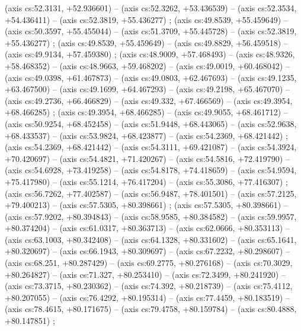     (axis cs:52.3131,    +52.936601) --  (axis cs:52.3262,    +53.436539) --  (axis cs:52.3534,    +54.436411) --  (axis cs:52.3819,    +55.436277) ;
    (axis cs:49.8539,    +55.459649) --  (axis cs:50.3597,    +55.455044) --  (axis cs:51.3709,    +55.445728) --  (axis cs:52.3819,    +55.436277) ;
    (axis cs:49.8539,    +55.459649) --  (axis cs:49.8829,    +56.459518) --  (axis cs:49.9134,    +57.459380) ;
    (axis cs:48.9009,    +57.468493) --  (axis cs:48.9326,    +58.468352) --  (axis cs:48.9663,    +59.468202) --  (axis cs:49.0019,    +60.468042) --  (axis cs:49.0398,    +61.467873) --  (axis cs:49.0803,    +62.467693) --  (axis cs:49.1235,    +63.467500) --  (axis cs:49.1699,    +64.467293) --  (axis cs:49.2198,    +65.467070) --  (axis cs:49.2736,    +66.466829) --  (axis cs:49.332,    +67.466569) --  (axis cs:49.3954,    +68.466285) ;
    (axis cs:49.3954,    +68.466285) --  (axis cs:49.9055,    +68.461712) --  (axis cs:50.9254,    +68.452458) --  (axis cs:51.9448,    +68.443065) --  (axis cs:52.9638,    +68.433537) --  (axis cs:53.9824,    +68.423877) --  (axis cs:54.2369,    +68.421442) ;
    (axis cs:54.2369,    +68.421442) --  (axis cs:54.3111,    +69.421087) --  (axis cs:54.3924,    +70.420697) --  (axis cs:54.4821,    +71.420267) --  (axis cs:54.5816,    +72.419790) --  (axis cs:54.6928,    +73.419258) --  (axis cs:54.8178,    +74.418659) --  (axis cs:54.9594,    +75.417980) --  (axis cs:55.1214,    +76.417204) --  (axis cs:55.3086,    +77.416307) ;
    (axis cs:56.7262,    +77.402587) --  (axis cs:56.9487,    +78.401501) --  (axis cs:57.2125,    +79.400213) --  (axis cs:57.5305,    +80.398661) ;
    (axis cs:57.5305,    +80.398661) --  (axis cs:57.9202,    +80.394843) --  (axis cs:58.9585,    +80.384582) --  (axis cs:59.9957,    +80.374204) --  (axis cs:61.0317,    +80.363713) --  (axis cs:62.0666,    +80.353113) --  (axis cs:63.1003,    +80.342408) --  (axis cs:64.1328,    +80.331602) --  (axis cs:65.1641,    +80.320697) --  (axis cs:66.1943,    +80.309697) --  (axis cs:67.2232,    +80.298607) --  (axis cs:68.251,    +80.287429) --  (axis cs:69.2775,    +80.276168) --  (axis cs:70.3029,    +80.264827) --  (axis cs:71.327,    +80.253410) --  (axis cs:72.3499,    +80.241920) --  (axis cs:73.3715,    +80.230362) --  (axis cs:74.392,    +80.218739) --  (axis cs:75.4112,    +80.207055) --  (axis cs:76.4292,    +80.195314) --  (axis cs:77.4459,    +80.183519) --  (axis cs:78.4615,    +80.171675) --  (axis cs:79.4758,    +80.159784) --  (axis cs:80.4888,    +80.147851) ;
